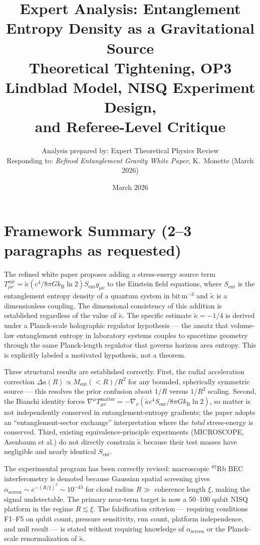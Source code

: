 \documentclass[12pt,letterpaper]{article}
\title{\textbf{Expert Analysis: Entanglement Entropy Density as a Gravitational Source}\\[6pt]
\large Theoretical Tightening, OP3 Lindblad Model, NISQ Experiment Design,\\
and Referee-Level Critique}
\author{Analysis prepared by: Expert Theoretical Physics Review\\[2pt]
\small Responding to: \textit{Refined Entanglement Gravity White Paper}, K.\ Monette (March 2026)}
\date{March 2026}
\theoremstyle{plain}
\theoremstyle{definition}
\theoremstyle{remark}
\newcommand{\kB}{k_{\mathrm{B}}}
\newcommand{\kt}{\tilde{\kappa}}
\newcommand{\Sent}{S_{\mathrm{ent}}}
\newcommand{\Ment}{M_{\mathrm{ent}}}
\newcommand{\asc}{\alpha_{\mathrm{screen}}}
\begin{document}
\maketitle
\tableofcontents
\bigskip

\section*{Framework Summary (2--3 paragraphs as requested)}

The refined white paper proposes adding a stress-energy source term
$T^{\mathrm{ent}}_{\mu\nu} = \tilde{\kappa}(c^4/8\pi G\kB\ln 2)\Sent g_{\mu\nu}$
to the Einstein field equations, where $\Sent$ is the entanglement entropy density of a
quantum system in bit\,m$^{-3}$ and $\kt$ is a dimensionless coupling.  The dimensional
consistency of this addition is established regardless of the value of $\kt$.  The specific
estimate $\kt = -1/4$ is derived under a Planck-scale holographic regulator
hypothesis --- the ansatz that volume-law entanglement entropy in laboratory systems
couples to spacetime geometry through the same Planck-length regulator that governs
horizon area entropy.  This is explicitly labeled a motivated hypothesis, not a theorem.

Three structural results are established correctly.  First, the radial acceleration
correction $\Delta a(R) \propto \Ment(<\!R)/R^2$ for any bounded, spherically symmetric
source --- this resolves the prior confusion about $1/R$ versus $1/R^2$ scaling.  Second,
the Bianchi identity forces $\nabla^\mu T^{\mathrm{matter}}_{\mu\nu} = -\nabla_\nu(\kt c^4 \Sent/8\pi G\kB\ln 2)$,
so matter is not independently conserved in entanglement-entropy gradients; the paper
adopts an ``entanglement-sector exchange'' interpretation where the \emph{total} stress-energy
is conserved.  Third, existing equivalence-principle experiments (MICROSCOPE, Asenbaum et al.)
do not directly constrain $\kt$ because their test masses have negligible and nearly identical
$\Sent$.

The experimental program has been correctly revised: macroscopic $^{87}$Rb BEC interferometry
is demoted because Gaussian spatial screening gives $\asc \sim e^{-(R/\xi)^2} \sim 10^{-43}$
for cloud radius $R \gg$ coherence length $\xi$, making the signal undetectable.  The primary
near-term target is now a 50--100 qubit NISQ platform in the regime $R \lesssim \xi$.
The falsification criterion --- requiring conditions F1--F5 on qubit count, pressure
sensitivity, run count, platform independence, and null result --- is stated without requiring
knowledge of $\asc$ or the Planck-scale renormalization of $\kt$.
\end{document}
